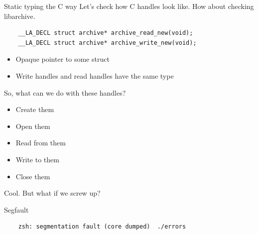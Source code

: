 \documentclass{beamer}
\begin{document}
\begin{frame}[fragile]{Static typing the C way}
  Let's check how C handles look like. How about checking libarchive.
  \begin{verbatim}
    __LA_DECL struct archive* archive_read_new(void);
    __LA_DECL struct archive* archive_write_new(void);
  \end{verbatim}
  \begin{itemize}
    \item Opaque pointer to some struct
    \item Write handles and read handles have the same type
  \end{itemize}
\end{frame}

\begin{frame}
  So, what can we do with these handles?
  \pause
  \begin{itemize}
    \item Create them
    \item Open them
    \item Read from them
    \item Write to them
    \item Close them
  \end{itemize}
  \pause
  Cool.
  \pause
  \alert{But what if we screw up?}
\end{frame}

\begin{frame}[fragile]{Segfault}
  \begin{verbatim}
    zsh: segmentation fault (core dumped)  ./errors
  \end{verbatim}
\end{frame}
\end{document}
